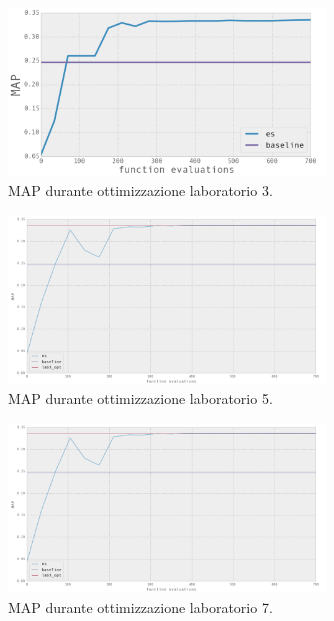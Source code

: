 \begin{figure}[htbp]
	\begin{center}
		\includegraphics[width=0.75\textwidth]{figures/es_lab3.png}
		\caption{MAP durante ottimizzazione laboratorio 3.}
		\label{fig:es_lab3}
	\end{center}
\end{figure}
\begin{figure}[htbp]
	\begin{center}
		\includegraphics[width=0.75\textwidth]{figures/es_lab5.png}
		\caption{MAP durante ottimizzazione laboratorio 5.}
		\label{fig:es_lab5}
	\end{center}
\end{figure}
\begin{figure}[htbp]
	\begin{center}
		\includegraphics[width=0.75\textwidth]{figures/es_lab5.png}
		\caption{MAP durante ottimizzazione laboratorio 7.}
		\label{fig:es_lab7}
	\end{center}
\end{figure}

